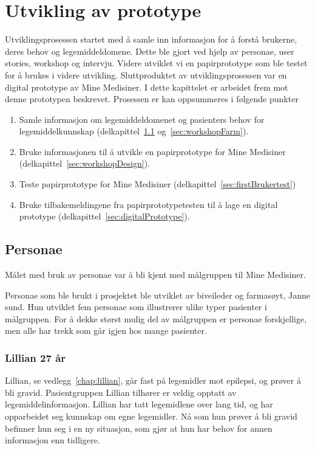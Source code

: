 \chapter{Utvikling av prototype}\label{chap:utvikleprototype}

Utviklingsprosessen startet med å samle inn informasjon for å forstå brukerne, deres behov og legemiddeldomene. Dette ble gjort ved hjelp av personae, user stories, workshop og intervju. Videre utviklet vi en papirprototype som ble testet for å brukes i videre utvikling. Sluttproduktet av utviklingsprosessen var en digital prototype av Mine Medisiner. I dette kapittelet er arbeidet frem mot denne prototypen beskrevet.
Prosessen er kan oppsummeres i følgende punkter
\begin{enumerate}
\item Samle informasjon om legemiddeldomenet og pasienters behov for legemiddelkunnskap (delkapittel~\ref{sec:personae} og~\ref{sec:workshopFarm}). 
\item Bruke informasjonen til å utvikle en papirprototype for Mine Medisiner (delkapittel~\ref{sec:workshopDesign}). 
\item Teste papirprototype for Mine Medisiner (delkapittel~\ref{sec:firstBrukertest})
\item Bruke tilbakemeldingene fra papirprototypetesten til å lage en digital prototype (delkapittel~\ref{sec:digitalPrototype}). 
\end{enumerate}


\section{Personae}\label{sec:personae}
Målet med bruk av personae var å bli kjent med målgruppen til Mine Medisiner. 

Personae som ble brukt i prosjektet ble utviklet av biveileder og farmasøyt, Janne sund. Hun utviklet fem personae som illustrerer ulike typer pasienter i målgruppen. For å dekke størst mulig del av målgruppen er personae forskjellige, men alle har trekk som går igjen hos mange pasienter.

\subsection{Lillian 27 år}
Lillian, se vedlegg~\ref{chap:lillian}, går fast på legemidler mot epilepsi, og prøver å bli gravid. Pasientgruppen Lillian tilhører er veldig opptatt av legemiddelinformasjon. Lillian har tatt legemidlene over lang tid, og har opparbeidet seg kunnskap om egne legemidler. Nå som hun prøver å bli gravid befinner hun seg i en ny situasjon, som gjør at hun har behov for annen informasjon enn tidligere.

